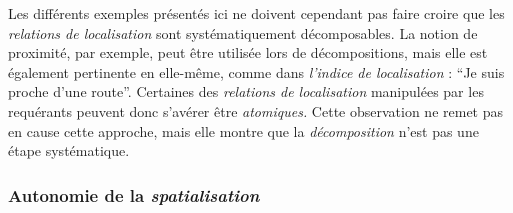 Les différents exemples présentés ici ne doivent cependant pas faire
croire que les \emph{relations de localisation} sont systématiquement
décomposables. La notion de proximité, par exemple, peut être utilisée
lors de décompositions, mais elle est également pertinente en
elle-même, comme dans \emph{l'indice de localisation} : \enquote{Je
  suis proche d'une route}. Certaines des \emph{relations de
  localisation} manipulées par les requérants peuvent donc s’avérer
être \emph{atomiques.} Cette observation ne remet pas en cause cette
approche, mais elle montre que la \emph{décomposition} n'est pas une
étape systématique.


\subsubsection{Autonomie de la \emph{spatialisation}}

